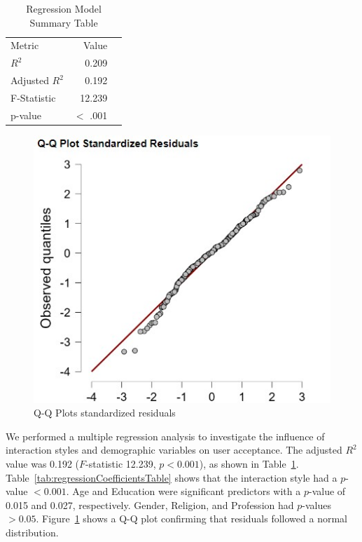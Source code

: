 \documentclass[conference]{IEEEtran}
\begin{document}
\begin{table}[h]
    \centering
    \caption{Regression Model Summary Table}
    \label{tab:regressionModelSummaryTable}
        \begin{tabular}{lrr}
            \toprule
            Metric & Value  \\
            \cmidrule[0.4pt]{1-2}
            $R^2$ & 0.209 \\
            Adjusted $R^2$  & 0.192 \\
            F-Statistic & 12.239 \\
            p-value & $<$ .001 \\
            \bottomrule
        \end{tabular}
\end{table}

\begin{figure}[h]
    \centering
    \includegraphics[width=\linewidth]{images/Q-Q Plots for residuals.jpg}
    \caption{Q-Q Plots standardized residuals}
    \label{q_qplots}    
\end{figure}

We performed a multiple regression analysis to investigate the influence of interaction styles and demographic variables on user acceptance. The adjusted $R^2$ value was 0.192 ($F$-statistic 12.239, $p < 0.001$), as shown in Table~\ref{tab:regressionModelSummaryTable}. Table~\ref{tab:regressionCoefficientsTable} shows that the interaction style had a $p$-value $< 0.001$. Age and Education were significant predictors with a $p$-value of 0.015 and 0.027, respectively. Gender, Religion, and Profession had $p$-values $> 0.05$. Figure~\ref{q_qplots} shows a Q-Q plot confirming that residuals followed a normal distribution.
\end{document}
